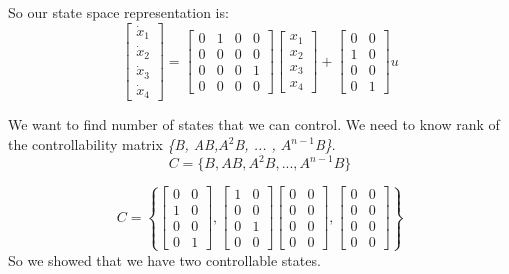 \documentclass[10pt,letterpaper]{article}
\begin{document}
So our state space representation is:
\begin{equation}
\begin{bmatrix}
\dot{x}_1\\ 
\dot{x}_2\\
\dot{x}_3\\
\dot{x}_4
\end{bmatrix} = \begin{bmatrix}
0 & 1 & 0 & 0 \\
0 & 0 & 0 & 0\\
0 & 0 & 0 & 1\\
0 & 0 & 0 & 0
\end{bmatrix}  \begin{bmatrix}
x_1\\
x_2\\
x_3\\
x_4
\end{bmatrix} + \begin{bmatrix}
0 & 0 \\
1 & 0 \\
0 & 0 \\
0 & 1
\end{bmatrix} u
\end{equation}

We want to find number of states that we can control. We need to know rank of the controllability matrix \emph{\{B, AB,$A^2$B, ... , $A^{n-1}$B\}}.
\begin{equation}
C = \{ B, AB, A^2B, ... , A^{n-1}B \}
\end{equation}

\begin{equation}
C=\left\{
\begin{bmatrix} 
0 & 0\\
1 & 0 \\
0 & 0 \\
0 & 1
\end{bmatrix}
,
\begin{bmatrix} 
1 & 0\\
0 & 0\\
0 & 1\\
0 & 0
\end{bmatrix}
\begin{bmatrix} 
0 & 0\\
0 & 0\\
0 & 0\\
0 & 0
\end{bmatrix}
,
\begin{bmatrix} 
0 & 0\\
0 & 0\\
0 & 0\\
0 & 0
\end{bmatrix}
 \right\}
\end{equation}
So we showed that we have two controllable states.
\end{document}
